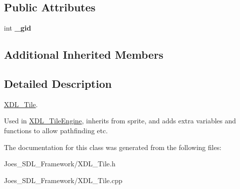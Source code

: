 \subsection*{Public Attributes}
\begin{DoxyCompactItemize}
\item 
\hypertarget{class_x_d_l___tile_aeb90ee0ab5ad7a0d061fd0e56bbbcee6}{int {\bfseries \-\_\-gid}}\label{class_x_d_l___tile_aeb90ee0ab5ad7a0d061fd0e56bbbcee6}

\end{DoxyCompactItemize}
\subsection*{Additional Inherited Members}


\subsection{Detailed Description}
\hyperlink{class_x_d_l___tile}{X\-D\-L\-\_\-\-Tile}. 

Used in \hyperlink{class_x_d_l___tile_engine}{X\-D\-L\-\_\-\-Tile\-Engine}, inherits from sprite, and adds extra variables and functions to allow pathfinding etc. 

The documentation for this class was generated from the following files\-:\begin{DoxyCompactItemize}
\item 
Joes\-\_\-\-S\-D\-L\-\_\-\-Framework/X\-D\-L\-\_\-\-Tile.\-h\item 
Joes\-\_\-\-S\-D\-L\-\_\-\-Framework/X\-D\-L\-\_\-\-Tile.\-cpp\end{DoxyCompactItemize}
